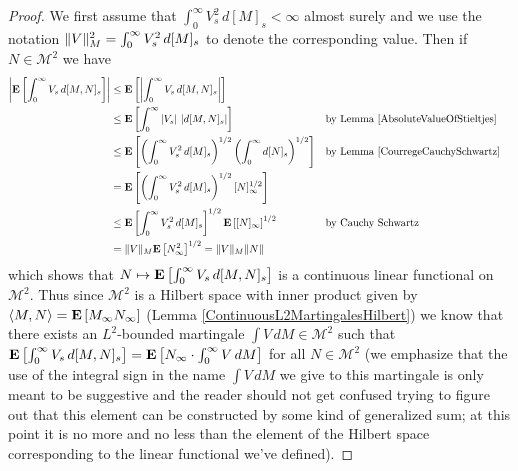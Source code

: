 \begin{proof}
We first assume that $\int_0^\infty V^2_s \, d[M]_s < \infty$ almost surely and we use the notation $\lVert V \rVert^2_M = \int_0^\infty V^2_s \, d[M]_s$ to denote the corresponding value.  Then if $N \in \mathcal{M}^2$ we have
\begin{align*}
\left \vert \textbf{E}\left[\int_0^\infty V_s \, d[M,N]_s\right] \right \vert &\leq \textbf{E}\left[\left \vert \int_0^\infty V_s \, d[M,N]_s \right \vert\right] \\
&\leq  \textbf{E}\left[\int_0^\infty \left \vert V_s \right \vert \, \left \vert  d[M,N]_s \right \vert\right] && \text{by Lemma \ref{AbsoluteValueOfStieltjes}} \\
&\leq  \textbf{E}\left[\left(\int_0^\infty V^2_s \, d[M]_s\right)^{1/2}\left(\int_0^\infty d[N]_s\right)^{1/2}\right] && \text{by Lemma \ref{CourregeCauchySchwartz}} \\
&=  \textbf{E}\left[\left(\int_0^\infty V^2_s \, d[M]_s\right)^{1/2}[N]_\infty^{1/2}\right] \\
&\leq \textbf{E}\left[\int_0^\infty V^2_s \, d[M]_s\right]^{1/2}\textbf{E}\left[[N]_\infty\right]^{1/2} && \text{by Cauchy Schwartz} \\
&=\lVert V \rVert_M \textbf{E}\left[N^2_\infty\right]^{1/2} = \lVert V \rVert_M \lVert N \rVert
\end{align*}
which shows that $N \mapsto \textbf{E}\left[\int_0^\infty V_s \, d[M,N]_s\right]$ is a continuous linear functional on $\mathcal{M}^2$.  Thus since $\mathcal{M}^2$ is a Hilbert space with inner product given by $\langle M,N \rangle = \textbf{E}\left[M_\infty N_\infty\right]$ (Lemma \ref{ContinuousL2MartingalesHilbert}) we know that there exists an $L^2$-bounded martingale $\int V \, dM \in \mathcal{M}^2$ such that $\textbf{E}\left[\int_0^\infty V_s \, d[M,N]_s \right] = \textbf{E}\left[N_\infty \cdot \int_0^\infty V \, dM\right]$ for all $N \in \mathcal{M}^2$ (we emphasize that the use of the integral sign in the name $\int V \, dM$ we give to this martingale is only meant to be suggestive and the reader should not get confused trying to figure out that this element can be constructed by some kind of generalized sum; at this point it is no more and no less than the element of the Hilbert space corresponding to the linear functional we've defined).


\end{proof}
